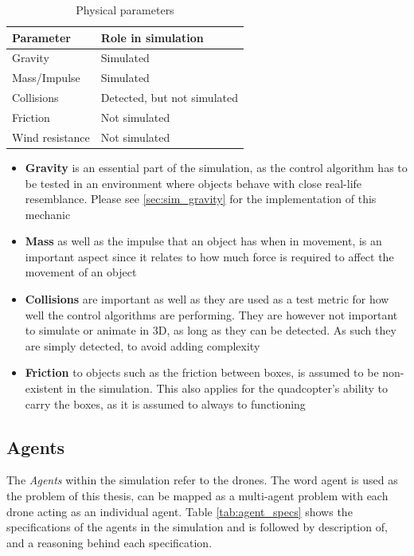 \begin{table}[H]
\centering
\begin{tabularx}{.7\textwidth}{lX}
\toprule
\textbf{Parameter} & \textbf{Role in simulation}\\ \midrule
Gravity           & Simulated                   \\
Mass/Impulse      & Simulated                   \\
Collisions        & Detected, but not simulated \\
Friction          & Not simulated               \\
Wind resistance   & Not simulated               \\ \bottomrule
\end{tabularx}
\caption{Physical parameters}
\label{tab:physics}
\end{table}

\begin{itemize}
\item{\textbf{Gravity} is an essential part of the simulation, as the control algorithm has to be tested in an environment where objects behave with close real-life resemblance. Please see \ref{sec:sim_gravity} for the implementation of this mechanic} 
\item{\textbf{Mass} as well as the impulse that an object has when in movement, is an important aspect since it relates to how much force is required to affect the movement of an object}
\item{\textbf{Collisions} are important as well as they are used as a test metric for how well the control algorithms are performing. They are however not important to simulate or animate in 3D, as long as they can be detected. As such they are simply detected, to avoid adding complexity}
\item{\textbf{Friction} to objects such as the friction between boxes, is assumed to be non-existent in the simulation. This also applies for the quadcopter's ability to carry the boxes, as it is assumed to always to functioning}
\end{itemize}


\subsection{Agents}
\label{sec:agents}

The \textit{Agents} within the simulation refer to the drones. The word agent is used as the problem of this thesis, can be mapped as a multi-agent problem with each drone acting as an individual agent. Table \ref{tab:agent_specs} shows the specifications of the agents in the simulation and is followed by description of, and a reasoning behind each specification. 

